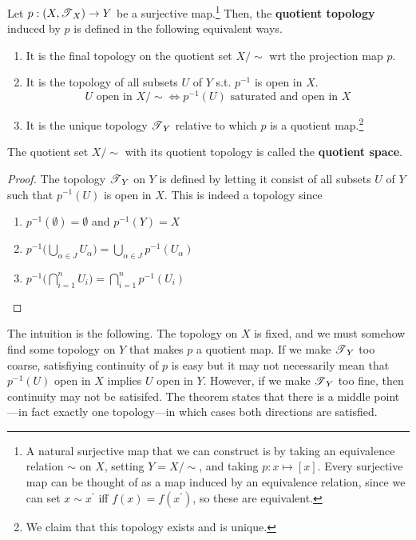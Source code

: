     \begin{definition}
      Let $p: (X, \T_X) \rightarrow Y$ be a surjective map.\footnote{A natural surjective map that we can construct is by taking an equivalence relation $\sim$ on $X$, setting $Y = X/\sim$, and taking $p: x \mapsto [x]$. Every surjective map can be thought of as a map induced by an equivalence relation, since we can set $x \sim x^\prime$ iff $f(x) = f(x^\prime)$, so these are equivalent.} Then, the \textbf{quotient topology} induced by $p$ is defined in the following equivalent ways. 
      \begin{enumerate}
        \item It is the final topology on the quotient set $X/\sim$ wrt the projection map $p$. 
        \item It is the topology of all subsets $U$ of $Y$ s.t. $p^{-1}$ is open in $X$. 
        \begin{equation}
          U \text{ open in } X/\sim \iff p^{-1} (U) \text{ saturated and open in } X
        \end{equation}
        \item It is the unique topology $\T_Y$ relative to which $p$ is a quotient map.\footnote{We claim that this topology exists and is unique.}
      \end{enumerate}
      The quotient set $X/\sim$ with its quotient topology is called the \textbf{quotient space}. 
    \end{definition}
    \begin{proof}
      The topology $\T_Y$ on $Y$ is defined by letting it consist of all subsets $U$ of $Y$ such that $p^{-1}(U)$ is open in $X$. This is indeed a topology since
      \begin{enumerate}
        \item $p^{-1} (\emptyset) = \emptyset$ and $p^{-1}(Y) = X$
        \item $p^{-1} \Big( \bigcup_{\alpha \in J} U_\alpha \Big) = \bigcup_{\alpha \in J} p^{-1} (U_\alpha)$
        \item $p^{-1} \Big( \bigcap_{i=1}^n U_i \Big) = \bigcap_{i=1}^n p^{-1} (U_i)$
      \end{enumerate}
    \end{proof}

    The intuition is the following. The topology on $X$ is fixed, and we must somehow find some topology on $Y$ that makes $p$ a quotient map. If we make $\T_Y$ too coarse, satisfiying continuity of $p$ is easy but it may not necessarily mean that $p^{-1}(U)$ open in $X$ implies $U$ open in $Y$. However, if we make $\T_Y$ too fine, then continuity may not be satisifed. The theorem states that there is a middle point---in fact exactly one topology---in which cases both directions are satisfied. 


